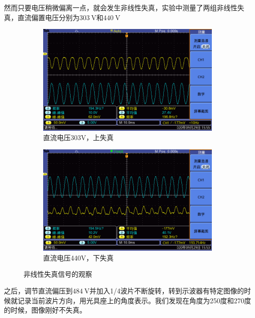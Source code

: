 \documentclass{ctexart}
\newcommand{\si}[1]{\  \mathrm{#1}}
\begin{document}
然而只要电压稍微偏离一点，就会发生非线性失真，实验中测量了两组非线性失真，直流偏置电压分别为$303 \si{V}$和$440 \si{V}$

\begin{figure}[H]
  \centering
  \begin{subfigure}{.48\textwidth}
    \centering
    \includegraphics[width=\linewidth]{晶体电光调制图像/没有波片/非线性失真303V/F0000TEK}
    \caption{直流电压303V，上失真}
  \end{subfigure}
  \begin{subfigure}{.48\textwidth}
    \centering
    \includegraphics[width=\linewidth]{晶体电光调制图像/没有波片/非线性失真440V/F0000TEK}
    \caption{直流电压440V，下失真}
  \end{subfigure}
  \caption{非线性失真信号的观察}
\end{figure}

之后，调节直流偏压到$484\si{V}$并加入1/4波片不断旋转，转到示波器有特定图像的时候就记录当前波片方向，用光具座上的角度表示。我们发现在角度为250度和270度的时候，图像刚好不失真。
\end{document}
